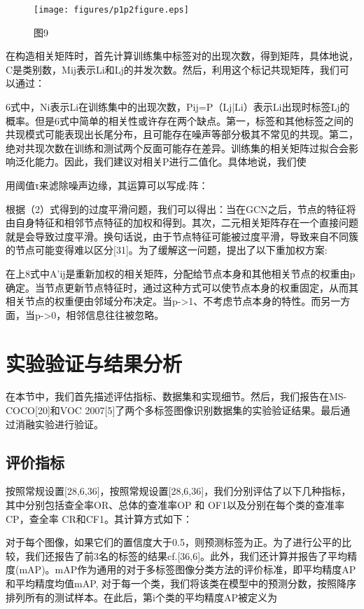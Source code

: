 \begin{figure}[htbp!]
	\centering
	\texttt{[image: figures/p1p2figure.eps]}
	\caption{图9}\label{fig:simuP1P2Result}
	\vspace{-1em}
\end{figure}


在构造相关矩阵时，首先计算训练集中标签对的出现次数，得到矩阵，具体地说，C是类别数，Mij表示Li和Lj的并发次数。然后，利用这个标记共现矩阵，我们可以通过：

6式中，Ni表示Li在训练集中的出现次数，Pij=P（Lj|Li）表示Li出现时标签Lj的概率。但是6式中简单的相关性或许存在两个缺点。第一，标签和其他标签之间的共现模式可能表现出长尾分布，且可能存在噪声等部分极其不常见的共现。第二，绝对共现次数在训练和测试两个反面可能存在差异。训练集的相关矩阵过拟合会影响泛化能力。因此，我们建议对相关P进行二值化。具体地说，我们使

用阈值τ来滤除噪声边缘，其运算可以写成:阵：

根据（2）式得到的过度平滑问题，我们可以得出：当在GCN之后，节点的特征将由自身特征和相邻节点特征的加权和得到。其次，二元相关矩阵存在一个直接问题就是会导致过度平滑。换句话说，由于节点特征可能被过度平滑，导致来自不同簇的节点可能变得难以区分[31]。为了缓解这一问题，提出了以下重加权方案:

在上8式中A’ij是重新加权的相关矩阵，分配给节点本身和其他相关节点的权重由p确定。当节点更新节点特征时，通过这种方式可以使节点本身的权重固定，从而其相关节点的权重便由邻域分布决定。当p->1、不考虑节点本身的特性。而另一方面，当p->0，相邻信息往往被忽略。


\chapter{实验验证与结果分析}
在本节中，我们首先描述评估指标、数据集和实现细节。然后，我们报告在MS-COCO[20]和VOC 2007[5]了两个多标签图像识别数据集的实验验证结果。最后通过消融实验进行验证。

\section{评价指标}
按照常规设置[28,6,36]，按照常规设置[28,6,36]，我们分别评估了以下几种指标，其中分别包括查全率OR、总体的查准率OP 和 OF1以及分别在每个类的查准率CP，查全率 CR和CF1。其计算方式如下：

对于每个图像，如果它们的置信度大于0.5，则预测标签为正。为了进行公平的比较，我们还报告了前3名的标签的结果cf.[36,6]。此外，我们还计算并报告了平均精度(mAP)。mAP作为通用的对于多标签图像分类方法的评价标准，即平均精度AP和平均精度均值mAP, 对于每一个类，我们将该类在模型中的预测分数，按照降序排列所有的测试样本。在此后，第i个类的平均精度AP被定义为

